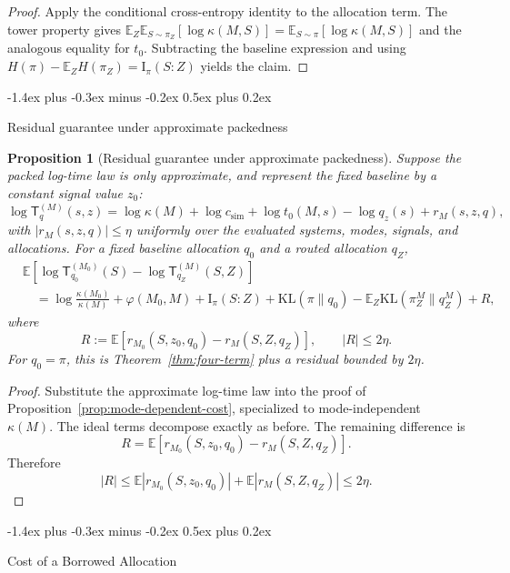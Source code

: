 \documentclass[10pt,twocolumn]{article}
\makeatletter
\theoremstyle{paperplain}
\newtheorem{proposition}[theorem]{Proposition}
\theoremstyle{paperdefinition}
\theoremstyle{paperremark}
\renewcommand{\subsection}{%
  \@startsection{subsection}{2}{\z@}%
    {-1.4ex plus -0.3ex minus -0.2ex}%
    {0.5ex plus 0.2ex}%
    {\normalfont\normalsize\bfseries\raggedright}}
\newcommand{\KL}{\mathrm{KL}}
\newcommand{\I}{\mathrm{I}}
\newcommand{\E}{\mathbb{E}}
\makeatother
\begin{document}
\begin{proof}
Apply the conditional cross-entropy identity to the allocation term. The tower property gives
$\E_Z\E_{S\sim\pi_Z}[\log\kappa(M,S)]=\E_{S\sim\pi}[\log\kappa(M,S)]$
and the analogous equality for $t_0$. Subtracting the baseline expression and using
$H(\pi)-\E_ZH(\pi_Z)=\I_\pi(S:Z)$ yields the claim.
\end{proof}

\subsection{Residual guarantee under approximate packedness}
\label{app:proof:prop:approximation-guarantee}

\begin{proposition}[Residual guarantee under approximate packedness]
\label{prop:approximation-guarantee}
Suppose the packed log-time law is only approximate, and represent the fixed baseline by a constant signal value $z_0$:
\[
\log \mathsf{T}_{q}^{(M)}(s,z)
=\log\kappa(M)+\log c_{\mathrm{sim}}+\log t_0(M,s)-\log q_z(s)
+r_M(s,z,q),
\]
with $|r_M(s,z,q)|\le\eta$ uniformly over the evaluated systems, modes, signals, and allocations.
For a fixed baseline allocation $q_0$ and a routed allocation $q_Z$,
\[
\begin{aligned}
&\E\!\left[\log \mathsf{T}_{q_0}^{(M_0)}(S)-\log \mathsf{T}_{q_Z}^{(M)}(S,Z)\right]\\
&\quad=
\log\frac{\kappa(M_0)}{\kappa(M)}
+\varphi(M_0,M)+\I_\pi(S:Z)
+\KL(\pi\|q_0)-\E_Z\KL(\pi_Z^M\|q_Z^M)+R,
\end{aligned}
\]
where
\[
R:=\E[r_{M_0}(S,z_0,q_0)-r_M(S,Z,q_Z)],
\qquad |R|\le 2\eta.
\]
For $q_0=\pi$, this is Theorem~\ref{thm:four-term} plus a residual bounded by $2\eta$.
\end{proposition}

\begin{proof}
Substitute the approximate log-time law into the proof of Proposition~\ref{prop:mode-dependent-cost}, specialized to mode-independent $\kappa(M)$. The ideal terms decompose exactly as before. The remaining difference is
\[
R=\E[r_{M_0}(S,z_0,q_0)-r_M(S,Z,q_Z)].
\]
Therefore
\[
|R|\le \E|r_{M_0}(S,z_0,q_0)|+\E|r_M(S,Z,q_Z)|\le 2\eta.
\]
\end{proof}

\subsection{Cost of a Borrowed Allocation}
\end{document}
